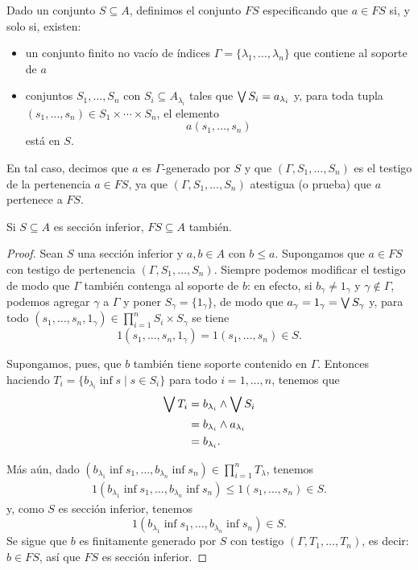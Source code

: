 \begin{definition}
  Dado un conjunto $S\subseteq A$, definimos el conjunto $FS$
  especificando que $a\in FS$ si, y solo si, existen:
  \begin{itemize}
    \item
      un conjunto finito no vacío de índices
      $\Gamma=\{\lambda_1,\dots,\lambda_n\}$ que contiene al
      soporte de $a$
    \item
      conjuntos $S_1,\dots,S_n$ con
      $S_i\subseteq A_{\lambda_i}$ tales que $\bigvee S_i =
      a_{\lambda_i}$ y, para toda tupla
      $(s_1,\dots,s_n)\in S_1\times\cdots\times S_n$, el elemento
      \[
        a(s_1,\dots,s_n)
      \]
      está en $S$.
  \end{itemize}
  En tal caso, decimos que $a$ es $\Gamma$-generado por $S$ y
  que $(\Gamma,S_1,\dots,S_n)$ es el testigo de la pertenencia $a\in FS$,
  ya que $(\Gamma,S_1,\dots,S_n)$ atestigua (o prueba) que
  $a$ pertenece a $FS$.
\end{definition}

\begin{lemma}
  Si $S\subseteq A$ es sección inferior, $FS\subseteq A$ también.
\end{lemma}
\begin{proof}
Sean $S$ una sección inferior y $a,b\in A$ con $b\leq a$.
Supongamos que $a\in FS$ con testigo de pertenencia
$(\Gamma,S_1,\dots,S_n)$.
Siempre podemos modificar el testigo de modo que
$\Gamma$ también contenga al soporte de $b$:
en efecto, si $b_\gamma\neq 1_\gamma$ y $\gamma\not\in\Gamma$,
podemos agregar $\gamma$ a $\Gamma$ y poner
$S_\gamma = \{1_\gamma\}$,
de modo que $a_\gamma = 1_\gamma = \bigvee S_\gamma$
y, para todo
$(s_1,\dots,s_n,1_\gamma)\in\prod_{i=1}^nS_i\times S_\gamma$
se tiene
\[
  1(s_1,\dots,s_n,1_\gamma) = 1(s_1,\dots,s_n) \in S
.\]

Supongamos, pues, que $b$ también tiene soporte contenido en
$\Gamma$.
Entonces haciendo $T_i=\{b_{\lambda_i}\inf s \mid s\in S_i\}$
para todo $i=1,\dots,n$, tenemos que
\begin{align*}
  \bigvee T_i
  &= b_{\lambda_i}\wedge\bigvee S_i \\
  &= b_{\lambda_i}\wedge a_{\lambda_i} \\
  &= b_{\lambda_i}.
\end{align*}

Más aún, dado $(b_{\lambda_1}\inf s_1,\dots,b_{\lambda_n}\inf
s_n)\in \prod_{i=1}^n T_\lambda$, tenemos
\begin{align*}
  1(b_{\lambda_1}\inf s_1,\dots,b_{\lambda_n}\inf s_n)
  \leq 1(s_1,\dots,s_n) \in S.
\end{align*}
y, como $S$ es sección inferior, tenemos
\[
  1(b_{\lambda_1}\inf s_1,\dots,b_{\lambda_n}\inf s_n) \in S
.\]
Se sigue que $b$ es finitamente generado por $S$ con testigo
$(\Gamma,T_1,\dots,T_n)$, es decir: $b\in FS$,
así que $FS$ es sección inferior.
\end{proof}

